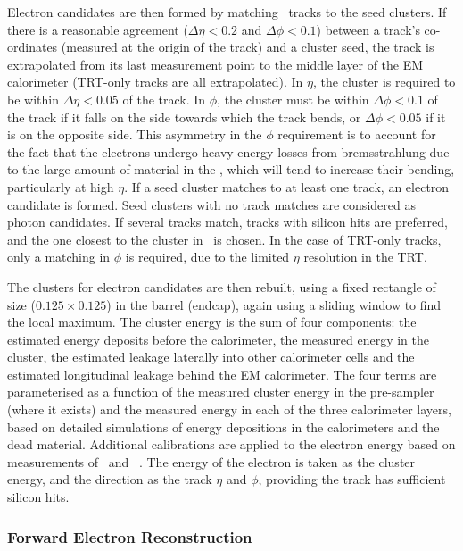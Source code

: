 Electron candidates are then formed by matching \id\ tracks to the
seed clusters. If there is a reasonable agreement ($\Delta \eta <0.2$ and
$\Delta \phi <0.1$) between a track's co-ordinates (measured at the origin of the
track) and a cluster seed, the track is extrapolated from its last measurement point to
the middle layer of the EM calorimeter (TRT-only tracks are all
extrapolated). In $\eta$, the cluster is required to be within 
$\Delta \eta <0.05$ of the track. In $\phi$, the cluster must be within $\Delta \phi < 0.1$ of
the track if it falls on the side towards which the track bends, or $\Delta
\phi < 0.05$ if it is on the opposite side. This asymmetry in the $\phi$
requirement is to
account for the fact that the electrons undergo heavy energy losses from
bremsstrahlung due to the large amount of material in the \id, which
will tend to increase their bending,
particularly at high $\eta$. If a seed cluster matches to at least one track,
an electron candidate is formed. Seed clusters with no track matches are
considered as photon candidates. If several tracks match, tracks with
silicon hits are preferred, and the one closest to the cluster in \deltaR\ 
is chosen. In the case of TRT-only tracks, only a matching in $\phi$ is required, 
due to the limited $\eta$ resolution in the TRT.

The clusters for electron candidates are then rebuilt, using a fixed rectangle of size 
\deltaetadeltaphi{0.075}{0.175} ($0.125 \times 0.125$) in the barrel (endcap),
again using a sliding window to find the local maximum. The cluster energy is
the sum of four components: the estimated energy deposits before the
calorimeter, the measured energy in the cluster, the estimated leakage laterally
into other calorimeter cells and the estimated longitudinal leakage behind the
EM calorimeter. The four terms are parameterised as a function of the measured
cluster energy in the pre-sampler (where it exists) and the measured energy in each of the three
calorimeter layers, based on detailed simulations of energy depositions in the
calorimeters and the dead material. Additional calibrations are
applied to the electron energy based on measurements of \Zee\ and
\JPsiee~\cite{Aad:2011mk}. The energy of the electron is taken as the cluster
energy, and the direction as the track $\eta$ and $\phi$, providing the track
has sufficient silicon hits.

\subsubsection{Forward Electron Reconstruction}

